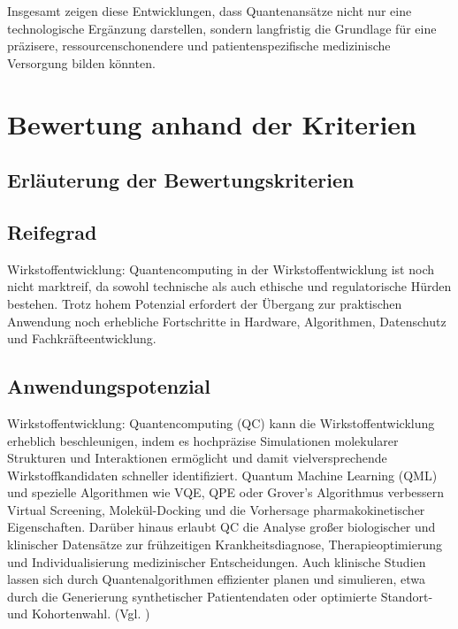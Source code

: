 Insgesamt zeigen diese Entwicklungen, dass Quantenansätze nicht nur eine technologische Ergänzung darstellen, sondern langfristig die Grundlage für eine präzisere, ressourcenschonendere und patientenspezifische medizinische Versorgung bilden könnten.



\section{Bewertung anhand der Kriterien}

\subsection*{Erläuterung der Bewertungskriterien}

\subsection{Reifegrad}
Wirkstoffentwicklung:
Quantencomputing in der Wirkstoffentwicklung ist noch nicht marktreif, da sowohl technische als auch ethische und regulatorische Hürden bestehen. Trotz hohem Potenzial erfordert der Übergang zur praktischen Anwendung noch erhebliche Fortschritte in Hardware, Algorithmen, Datenschutz und Fachkräfteentwicklung.\cite{flother_state_2023}



\subsection{Anwendungspotenzial}

Wirkstoffentwicklung:
Quantencomputing (QC) kann die Wirkstoffentwicklung erheblich beschleunigen, indem es hochpräzise Simulationen molekularer Strukturen und Interaktionen ermöglicht und damit vielversprechende Wirkstoffkandidaten schneller identifiziert. Quantum Machine Learning (QML) und spezielle Algorithmen wie VQE, QPE oder Grover’s Algorithmus verbessern Virtual Screening, Molekül-Docking und die Vorhersage pharmakokinetischer Eigenschaften. Darüber hinaus erlaubt QC die Analyse großer biologischer und klinischer Datensätze zur frühzeitigen Krankheitsdiagnose, Therapieoptimierung und Individualisierung medizinischer Entscheidungen. Auch klinische Studien lassen sich durch Quantenalgorithmen effizienter planen und simulieren, etwa durch die Generierung synthetischer Patientendaten oder optimierte Standort- und Kohortenwahl. (Vgl. \cite{bertl_quantum_2025})

